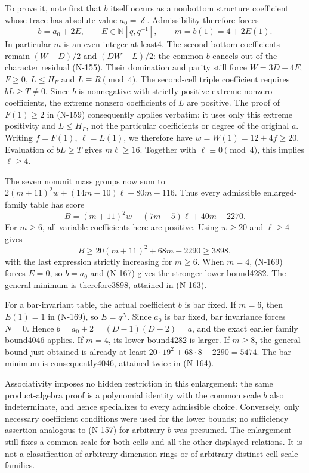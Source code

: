 To prove it, note first that $b$ itself occurs as a nonbottom
structure coefficient whose trace has absolute value $a_0=|\delta|$.
Admissibility therefore forces
\[
 b=a_0+2E,\qquad E\in\mathbb N[q,q^{-1}],\qquad
 m=b(1)=4+2E(1).
 \tag{N-169}
\]
In particular $m$ is an even integer at least4.
The second bottom coefficients remain $(W-D)/2$ and $(DW-L)/2$:
the common $b$ cancels out of the character residual (N-155).
Their domination and parity still force $W=3D+4F$, $F\ge0$,
$L\le H_F$ and $L\equiv R\pmod4$.
The second-cell triple coefficient requires $bL\ge T\ne0$.
Since $b$ is nonnegative with strictly positive extreme nonzero
coefficients, the extreme nonzero coefficients of $L$ are positive.
The proof of $F(1)\ge2$ in (N-159) consequently applies verbatim:
it uses only this extreme positivity and $L\le H_F$, not the
particular coefficients or degree of the original $a$.
Writing $f=F(1)$, $\ell=L(1)$, we therefore have
$w=W(1)=12+4f\ge20$.
Evaluation of $bL\ge T$ gives $m\ell\ge16$.
Together with $\ell\equiv0\pmod4$, this implies $\ell\ge4$.

The seven nonunit mass groups now sum to
$2(m+11)^2w+(14m-10)\ell+80m-116$.
Thus every admissible enlarged-family table has score
\[
 B=(m+11)^2w+(7m-5)\ell+40m-2270.
 \tag{N-170}
\]
For $m\ge6$, all variable coefficients here are positive.
Using $w\ge20$ and $\ell\ge4$ gives
\[
 B\ge20(m+11)^2+68m-2290\ge3898,
\]
with the last expression strictly increasing for $m\ge6$.
When $m=4$, (N-169) forces $E=0$, so $b=a_0$ and (N-167)
gives the stronger lower bound4282.  The general minimum is
therefore3898, attained in (N-163).

For a bar-invariant table, the actual coefficient $b$ is bar fixed.
If $m=6$, then $E(1)=1$ in (N-169), so $E=q^N$.
Since $a_0$ is bar fixed, bar invariance forces $N=0$.
Hence $b=a_0+2=(D-1)(D-2)=a$, and the exact earlier family
bound4046 applies.  If $m=4$, its lower bound4282 is larger.
If $m\ge8$, the general bound just obtained is already at least
$20\cdot19^2+68\cdot8-2290=5474$.
The bar minimum is consequently4046, attained twice in (N-164).

Associativity imposes no hidden restriction in this enlargement:
the same product-algebra proof is a polynomial identity with the
common scale $b$ also indeterminate, and hence specializes to every
admissible choice.  Conversely, only necessary coefficient
conditions were used for the lower bounds; no sufficiency assertion
analogous to (N-157) for arbitrary $b$ was presumed.
The enlargement still fixes a common scale for both cells and all
the other displayed relations.  It is not a classification of
arbitrary dimension rings or of arbitrary distinct-cell-scale
families.

